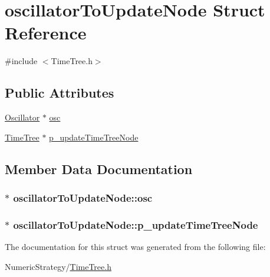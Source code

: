 \hypertarget{structoscillator_to_update_node}{\section{oscillator\+To\+Update\+Node Struct Reference}
\label{structoscillator_to_update_node}
}


{\ttfamily \#include $<$Time\+Tree.\+h$>$}

\subsection*{Public Attributes}
\begin{DoxyCompactItemize}
\item 
\hyperlink{class_oscillator}{Oscillator} $\ast$ \hyperlink{structoscillator_to_update_node_af2b677090d95f416aca59154891a2a3f}{osc}
\item 
\hyperlink{struct_time_tree}{Time\+Tree} $\ast$ \hyperlink{structoscillator_to_update_node_af9878118a944b80883eb27d5edadf288}{p\+\_\+update\+Time\+Tree\+Node}
\end{DoxyCompactItemize}


\subsection{Member Data Documentation}
\hypertarget{structoscillator_to_update_node_af2b677090d95f416aca59154891a2a3f}{
\subsubsection[{osc}]{$\ast$ oscillator\+To\+Update\+Node\+::osc}}\label{structoscillator_to_update_node_af2b677090d95f416aca59154891a2a3f}
\hypertarget{structoscillator_to_update_node_af9878118a944b80883eb27d5edadf288}{
\subsubsection[{p\+\_\+update\+Time\+Tree\+Node}]{$\ast$ oscillator\+To\+Update\+Node\+::p\+\_\+update\+Time\+Tree\+Node}}\label{structoscillator_to_update_node_af9878118a944b80883eb27d5edadf288}


The documentation for this struct was generated from the following file\+:\begin{DoxyCompactItemize}
\item 
Numeric\+Strategy/\hyperlink{_time_tree_8h}{Time\+Tree.\+h}\end{DoxyCompactItemize}
